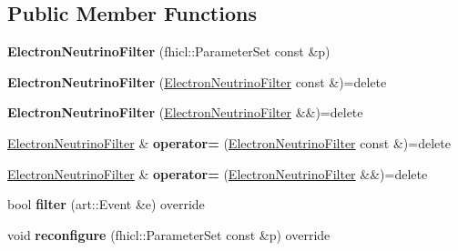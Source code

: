 \subsection*{Public Member Functions}
\begin{DoxyCompactItemize}
\item 
\hypertarget{classlee_1_1ElectronNeutrinoFilter_ad537c8e179a70178666c31f25a1d12d9}{{\bfseries Electron\-Neutrino\-Filter} (fhicl\-::\-Parameter\-Set const \&p)}\label{classlee_1_1ElectronNeutrinoFilter_ad537c8e179a70178666c31f25a1d12d9}

\item 
\hypertarget{classlee_1_1ElectronNeutrinoFilter_a25d84e7ecab146aa6b0e0363b505c961}{{\bfseries Electron\-Neutrino\-Filter} (\hyperlink{classlee_1_1ElectronNeutrinoFilter}{Electron\-Neutrino\-Filter} const \&)=delete}\label{classlee_1_1ElectronNeutrinoFilter_a25d84e7ecab146aa6b0e0363b505c961}

\item 
\hypertarget{classlee_1_1ElectronNeutrinoFilter_a97154ec66a795362acd5f35accf6f7d6}{{\bfseries Electron\-Neutrino\-Filter} (\hyperlink{classlee_1_1ElectronNeutrinoFilter}{Electron\-Neutrino\-Filter} \&\&)=delete}\label{classlee_1_1ElectronNeutrinoFilter_a97154ec66a795362acd5f35accf6f7d6}

\item 
\hypertarget{classlee_1_1ElectronNeutrinoFilter_a3d0689e2f0d746914a8cc9540328df91}{\hyperlink{classlee_1_1ElectronNeutrinoFilter}{Electron\-Neutrino\-Filter} \& {\bfseries operator=} (\hyperlink{classlee_1_1ElectronNeutrinoFilter}{Electron\-Neutrino\-Filter} const \&)=delete}\label{classlee_1_1ElectronNeutrinoFilter_a3d0689e2f0d746914a8cc9540328df91}

\item 
\hypertarget{classlee_1_1ElectronNeutrinoFilter_a14482d0f5624d8671cb0109c3b3f3d5c}{\hyperlink{classlee_1_1ElectronNeutrinoFilter}{Electron\-Neutrino\-Filter} \& {\bfseries operator=} (\hyperlink{classlee_1_1ElectronNeutrinoFilter}{Electron\-Neutrino\-Filter} \&\&)=delete}\label{classlee_1_1ElectronNeutrinoFilter_a14482d0f5624d8671cb0109c3b3f3d5c}

\item 
\hypertarget{classlee_1_1ElectronNeutrinoFilter_a81d6833e781342640df84654c8f7f203}{bool {\bfseries filter} (art\-::\-Event \&e) override}\label{classlee_1_1ElectronNeutrinoFilter_a81d6833e781342640df84654c8f7f203}

\item 
\hypertarget{classlee_1_1ElectronNeutrinoFilter_a891b82ec2e7b2ef034e701cf51a68ac5}{void {\bfseries reconfigure} (fhicl\-::\-Parameter\-Set const \&p) override}\label{classlee_1_1ElectronNeutrinoFilter_a891b82ec2e7b2ef034e701cf51a68ac5}


\end{DoxyCompactItemize}
